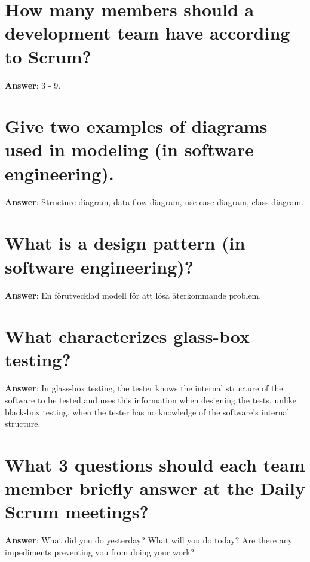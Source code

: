\documentclass[a4paper,11pt,oneside]{book}
\begin{document}
\begin{sloppypar}
\section{How many members should a development team have according to Scrum?}

\label{q:244:sa:en:True}

\textbf{Answer}: 3 - 9.



\section{Give two examples of diagrams used in modeling (in software engineering).}

\label{q:245:sa:en:True}

\textbf{Answer}: Structure diagram, data flow diagram, use case diagram, class diagram.



\section{What is a design pattern (in software engineering)?}

\label{q:246:sa:en:True}

\textbf{Answer}: En f\"orutvecklad modell f\"or att l\"osa \r{a}terkommande problem.



\section{What characterizes glass-box testing?}

\label{q:247:sa:en:True}

\textbf{Answer}: In glass-box testing, the tester knows the internal structure of the software to be tested and uses this information when designing the tests, unlike black-box testing, when the tester has no knowledge of the software's internal structure.



\section{What 3 questions should each team member briefly answer at the Daily Scrum meetings?}

\label{q:248:sa:en:True}

\textbf{Answer}: What did you do yesterday? What will you do today? Are there any impediments preventing you from doing your work?




\end{sloppypar}
\end{document}
